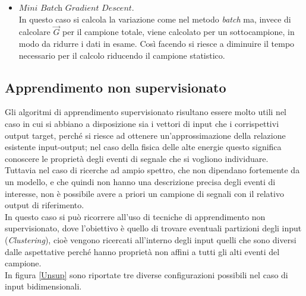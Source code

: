 \begin{itemize}
	\item $\textit{Mini Batch Gradient Descent}$. \\
	In questo caso si calcola la variazione come nel metodo \textit{batch} ma, invece di calcolare $\vec{G}$ per il campione totale, viene calcolato per un sottocampione, in modo da ridurre i dati in esame. Così facendo si riesce a diminuire il tempo necessario per il calcolo riducendo il campione statistico.
	
\end{itemize}

\newpage


\subsection{Apprendimento non supervisionato}
\label{app_non_sup}

Gli algoritmi di apprendimento supervisionato risultano essere molto utili nel caso in cui si abbiano a disposizione sia i vettori di input che i corrispettivi output target, perché si riesce ad ottenere un'approssimazione della relazione esistente input-output; nel caso della fisica delle alte energie questo significa conoscere le proprietà degli eventi di segnale che si vogliono individuare.\\
Tuttavia nel caso di ricerche ad ampio spettro, che non dipendano fortemente da un modello, e che quindi non hanno una descrizione precisa degli eventi di interesse, non è possibile avere a priori un campione di segnali con il relativo output di riferimento. \\
In questo caso si può ricorrere all'uso di tecniche di apprendimento non supervisionato, dove l'obiettivo è quello di trovare eventuali partizioni degli input (\textit{Clustering}), cioè vengono ricercati all'interno degli input quelli che sono diversi dalle aspettative perché hanno proprietà non affini a tutti gli alti eventi del campione. \\
In figura \ref{Unsup} sono riportate tre diverse configurazioni possibili nel caso di input bidimensionali.

